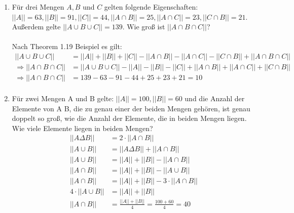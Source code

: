\begin{enumerate}[label=(\alph*)]
        \item Für drei Mengen $A, B$ und $C$ gelten folgende Eigenschaften: 
        $||A|| = 63, ||B|| = 91, ||C|| = 44, ||A\cap B|| = 25, ||A\cap C|| = 23, ||C \cap B|| = 21$. 
        Außerdem gelte $||A\cup B\cup C|| = 139$. Wie groß ist $||A \cap B \cap C||$?\\\\
        Nach Theorem 1.19 Beispiel es gilt:
        \begin{align*}
	        ||A\cup B\cup C|| &= ||A||+||B||+||C||-||A\cap B||-||A\cap C||-||C \cap B||+||A \cap B \cap C||\\
	        \Rightarrow ||A \cap B \cap C|| &= ||A\cup B\cup C||-||A||-||B||-||C||+||A\cap B||+||A\cap C||+||C \cap B||\\
	        \Rightarrow ||A \cap B \cap C|| &= 139 - 63 - 91 - 44 + 25 + 23 + 21 = 10 \\
        \end{align*}

        \item Für zwei Mengen A und B gelte: $||A|| = 100, ||B|| = 60$ und die Anzahl 
        der Elemente von A  B, die zu genau einer der beiden Mengen gehören, ist genau 
        doppelt so groß, wie die Anzahl der Elemente, die in beiden Mengen liegen. Wie viele Elemente 
        liegen in beiden Mengen?
        \begin{align*}
        	||A \Delta B|| &= 2 \cdot ||A \cap B|| \\
        	||A \cup B || &= ||A \Delta B|| + ||A \cap B|| \\
        	||A \cup B || &= ||A|| + ||B|| - ||A \cap B|| \\
        	||A \cap B || &= ||A|| + ||B|| - ||A \cup B|| \\
        	||A \cap B || &= ||A|| + ||B|| - 3\cdot||A \cap B|| \\
        	4 \cdot ||A \cup B || &= ||A|| + ||B|| \\
        	||A \cap B|| &= \frac{||A||+||B||}{4}= \frac{100 + 60}{4} = 40 
        \end{align*}
        

\end{enumerate}

